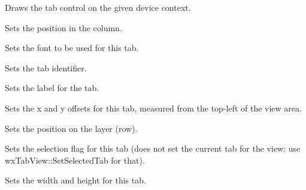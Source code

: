 

Draws the tab control on the given device context.



Sets the position in the column.



Sets the font to be used for this tab.



Sets the tab identifier.



Sets the label for the tab.



Sets the x and y offsets for this tab, measured from the top-left of the view area.



Sets the position on the layer (row).



Sets the selection flag for this tab (does not set the current tab for the view;
use wxTabView::SetSelectedTab for that).



Sets the width and height for this tab.

\section{}\label{wxtabview}

